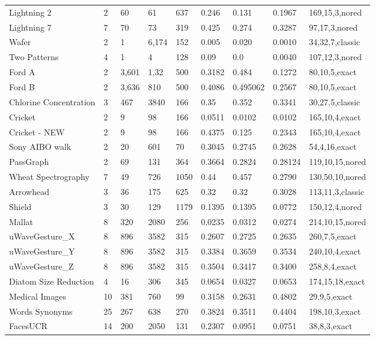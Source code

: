 \begin{table}[t!]
{{\begin{tabularx}{\linewidth}{@{} l *7X @{} l}
Lightning 2 & 2 & 60 & 61 & 637 & 0.246 & 0.131 & 0.1967 & 169,15,3,nored \\
Lightning 7 & 7 & 70 & 73 & 319 & 0.425 & 0.274 & 0.3287 & 97,17,3,nored \\
Wafer & 2 & 1 & 6,174 & 152 & 0.005 & 0.020 & 0.0010 & 34,32,7,classic \\
Two Patterns & 4 & 1 & 4 & 128 & 0.09 & 0.0 & 0.0040 & 107,12,3,nored \\
Ford A & 2 & 3,601 & 1,32 & 500 & 0.3182 & 0.484 & 0.1272 & 80,10,5,exact \\
Ford B & 2 & 3,636 & 810 & 500 & 0.4086 & 0.495062 & 0.2567 & 80,10,5,exact \\
Chlorine Concentration & 3 & 467 & 3840 & 166 & 0.35 & 0.352 & 0.3341 & 30,27,5,classic \\
Cricket & 2 & 9 & 98 & 166 & 0.0511 & 0.0102 & 0.0102 & 165,10,4,exact \\
Cricket - NEW & 2 & 9 & 98 & 166 & 0.4375 & 0.125 & 0.2343 & 165,10,4,exact \\
Sony AIBO walk & 2 & 20 & 601 & 70 & 0.3045 & 0.2745 & 0.2628 & 54,4,16,exact \\
PassGraph & 2 & 69 & 131 & 364 & 0.3664 & 0.2824 & 0.28124 & 119,10,15,nored \\
Wheat Spectrography & 7 & 49 & 726 & 1050 & 0.44 & 0.457 & 0.2790 & 130,50,10,nored \\
Arrowhead & 3 & 36 & 175 & 625 & 0.32 & 0.32 & 0.3028 & 113,11,3,classic \\
Shield & 3 & 30 & 129 & 1179 & 0.1395 & 0.1395 & 0.0772 & 150,12,4,nored \\
Mallat & 8 & 320 & 2080 & 256 & 0.0235 & 0.0312 & 0.0274 & 214,10,15,nored \\ 
uWaveGesture\_X & 8 & 896 & 3582 & 315 & 0.2607 & 0.2725 & 0.2635 & 260,7,5,exact \\
uWaveGesture\_Y & 8 & 896 & 3582 & 315 & 0.3384 & 0.3659 & 0.3534 & 240,10,4,exact \\
uWaveGesture\_Z & 8 & 896 & 3582 & 315 & 0.3504 & 0.3417 & 0.3400 & 258,8,4,exact \\
Diatom Size Reduction & 4 & 16 & 306 & 345 & 0.0654 & 0.0327 & 0.0653 & 174,15,18,exact \\
Medical Images & 10 & 381 & 760 & 99 & 0.3158 & 0.2631 & 0.4802 & 29,9,5,exact \\
Words Synonyms & 25 & 267 & 638 & 270 & 0.3824 & 0.3511 & 0.4404 & 198,10,3,exact \\
FacesUCR & 14 & 200 & 2050 & 131 & 0.2307 & 0.0951 & 0.0751 & 38,8,3,exact \\

\end{tabularx}}}
\end{table}
